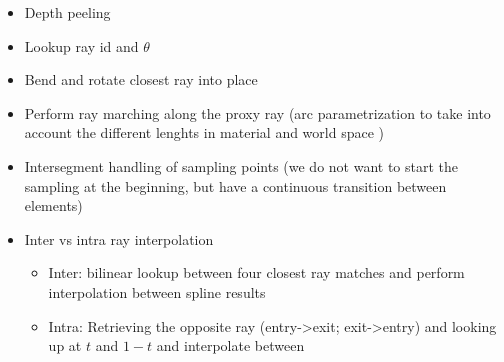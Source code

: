 \begin{itemize}
\begin{itemize}
    \item Depth peeling \cite{mammen89DepthPeeling}
    \item Lookup ray id and $\theta$
    \item Bend and rotate closest ray into place
    \item Perform ray marching along the proxy ray (arc parametrization to take into account the different lenghts in material and world space \cite{guenter90arclength})
    \item Intersegment handling of sampling points (we do not want to start the sampling at the beginning, but have a continuous transition between elements)
    \item Inter vs intra ray interpolation
    \begin{itemize}
        \item Inter: bilinear lookup between four closest ray matches and perform interpolation between spline results
        \item Intra: Retrieving the opposite ray (entry->exit; exit->entry) and looking up at $t$ and $1-t$ and interpolate between
    \end{itemize}
\end{itemize}

\end{itemize}

